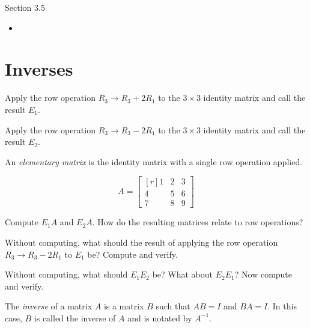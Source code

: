 \documentclass{problemset}
\newcommand{\mat}[1]{\begin{bmatrix*}[r]#1\end{bmatrix*}}
\begin{document}
\newpage
\pagestyle{siefken}

\begin{lesson}
	\newpage

	Section 3.5

	\begin{itemize}
		\item 
	\end{itemize}


	\newpage
\end{lesson}

\section*{Inverses}

	\question
	\begin{parts}
		\item Apply the row operation $R_3\to R_3+2R_1$ to the $3\times 3$ identity
		matrix and call the result $E_1$.
		\item Apply the row operation $R_3\to R_3-2R_1$ to the $3\times 3$ identity
		matrix and call the result $E_2$.
	\end{parts}

	\begin{definition}
	An \emph{elementary matrix} is the identity matrix with a single row operation applied.
	\end{definition}

	\[
		A=\mat{1&2&3\\4&5&6\\7&8&9}
	\]
	\begin{parts}[resume]
		\item Compute $E_1A$ and $E_2A$.  How do the resulting matrices relate to row
		operations?
		\item Without computing, what should the result of applying the row
		operation $R_3\to R_3-2R_1$ to $E_1$ be?  Compute and verify.
		\item Without computing, what should $E_1E_2$ be?  What about $E_2E_1$?
		Now compute and verify.
	\end{parts}

	\begin{definition}
		The \emph{inverse} of a matrix $A$ is a
		matrix $B$ such that $AB=I$ and $BA=I$.
		In this case, $B$ is called the inverse of $A$ and is notated by $A^{-1}$.
	\end{definition}
\end{document}
